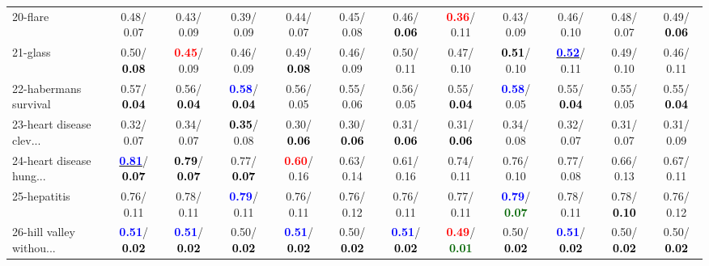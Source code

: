 \begin{table}[h]
\begin{center}
{\begin{tabular}{lc|c|c|c|c|c|c|c|c|c|c}
20-flare &   0.48/  0.07 &   0.43/  0.09 &   0.39/  0.09 &   0.44/  0.07 &   0.45/  0.08 &   0.46/\textcolor{black}{\textbf{  0.06}} & \textcolor{red}{\textbf{  0.36}}/  0.11 &   0.43/  0.09 &   0.46/  0.10 &   0.48/  0.07 &   0.49/\textcolor{black}{\textbf{  0.06}} \\
21-glass &   0.50/\textcolor{black}{\textbf{  0.08}} & \textcolor{red}{\textbf{  0.45}}/  0.09 &   0.46/  0.09 &   0.49/\textcolor{black}{\textbf{  0.08}} &   0.46/  0.09 &   0.50/  0.11 &   0.47/  0.10 & \textcolor{black}{\textbf{  0.51}}/  0.10 & \underline{\textcolor{blue}{\textbf{  0.52}}}/  0.11 &   0.49/  0.10 &   0.46/  0.11 \\ \hline
22-habermans survival &   0.57/\textcolor{black}{\textbf{  0.04}} &   0.56/\textcolor{black}{\textbf{  0.04}} & \textcolor{blue}{\textbf{  0.58}}/\textcolor{black}{\textbf{  0.04}} &   0.56/  0.05 &   0.55/  0.06 &   0.56/  0.05 &   0.55/\textcolor{black}{\textbf{  0.04}} & \textcolor{blue}{\textbf{  0.58}}/  0.05 &   0.55/\textcolor{black}{\textbf{  0.04}} &   0.55/  0.05 &   0.55/\textcolor{black}{\textbf{  0.04}} \\
23-heart disease clev... &   0.32/  0.07 &   0.34/  0.07 & \textcolor{black}{\textbf{  0.35}}/  0.08 &   0.30/\textcolor{black}{\textbf{  0.06}} &   0.30/\textcolor{black}{\textbf{  0.06}} &   0.31/\textcolor{black}{\textbf{  0.06}} &   0.31/\textcolor{black}{\textbf{  0.06}} &   0.34/  0.08 &   0.32/  0.07 &   0.31/  0.07 &   0.31/  0.09 \\
24-heart disease hung... & \underline{\textcolor{blue}{\textbf{  0.81}}}/\textcolor{black}{\textbf{  0.07}} & \textcolor{black}{\textbf{  0.79}}/\textcolor{black}{\textbf{  0.07}} &   0.77/\textcolor{black}{\textbf{  0.07}} & \textcolor{red}{\textbf{  0.60}}/  0.16 &   0.63/  0.14 &   0.61/  0.16 &   0.74/  0.11 &   0.76/  0.10 &   0.77/  0.08 &   0.66/  0.13 &   0.67/  0.11 \\
25-hepatitis &   0.76/  0.11 &   0.78/  0.11 & \textcolor{blue}{\textbf{  0.79}}/  0.11 &   0.76/  0.11 &   0.76/  0.12 &   0.76/  0.11 &   0.77/  0.11 & \textcolor{blue}{\textbf{  0.79}}/\textcolor{darkgreen}{\textbf{  0.07}} &   0.78/  0.11 &   0.78/\textcolor{black}{\textbf{  0.10}} &   0.76/  0.12 \\
26-hill valley withou... & \textcolor{blue}{\textbf{  0.51}}/\textcolor{black}{\textbf{  0.02}} & \textcolor{blue}{\textbf{  0.51}}/\textcolor{black}{\textbf{  0.02}} &   0.50/\textcolor{black}{\textbf{  0.02}} & \textcolor{blue}{\textbf{  0.51}}/\textcolor{black}{\textbf{  0.02}} &   0.50/\textcolor{black}{\textbf{  0.02}} & \textcolor{blue}{\textbf{  0.51}}/\textcolor{black}{\textbf{  0.02}} & \textcolor{red}{\textbf{  0.49}}/\textcolor{darkgreen}{\textbf{  0.01}} &   0.50/\textcolor{black}{\textbf{  0.02}} & \textcolor{blue}{\textbf{  0.51}}/\textcolor{black}{\textbf{  0.02}} &   0.50/\textcolor{black}{\textbf{  0.02}} &   0.50/\textcolor{black}{\textbf{  0.02}} \\

\end{tabular}}
\end{center}
\end{table}

